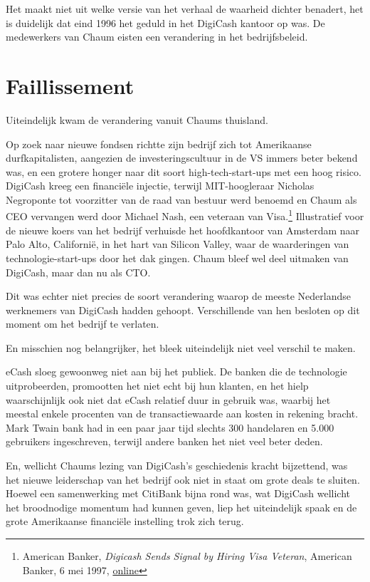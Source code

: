 \documentclass[
  a5paper,
  smalldemyvopaper,11pt,twoside,onecolumn,openright,extrafontsizes,
hidelinks]{memoir}
\begin{document}
Het maakt niet uit welke versie van het verhaal de waarheid dichter
benadert, het is duidelijk dat eind 1996 het geduld in het DigiCash
kantoor op was. De medewerkers van Chaum eisten een verandering in het
bedrijfsbeleid.

\section{Faillissement}\label{faillissement}

Uiteindelijk kwam de verandering vanuit Chaums thuisland.

Op zoek naar nieuwe fondsen richtte zijn bedrijf zich tot Amerikaanse
durfkapitalisten, aangezien de investeringscultuur in de VS immers beter
bekend was, en een grotere honger naar dit soort high-tech-start-ups met
een hoog risico. DigiCash kreeg een financiële injectie, terwijl
MIT-hoogleraar Nicholas Negroponte tot voorzitter van de raad van
bestuur werd benoemd en Chaum als CEO vervangen werd door Michael Nash,
een veteraan van Visa.\footnote{American Banker, \emph{Digicash Sends
  Signal by Hiring Visa Veteran}, American Banker, 6 mei 1997,
  \href{https://www.americanbanker.com/news/digicash-sends-signal-by-hiring-visa-veteran}{online}}
Illustratief voor de nieuwe koers van het bedrijf verhuisde het
hoofdkantoor van Amsterdam naar Palo Alto, Californië, in het hart van
Silicon Valley, waar de waarderingen van technologie-start-ups door het
dak gingen. Chaum bleef wel deel uitmaken van DigiCash, maar dan nu als
CTO.

Dit was echter niet precies de soort verandering waarop de meeste
Nederlandse werknemers van DigiCash hadden gehoopt. Verschillende van
hen besloten op dit moment om het bedrijf te verlaten.

En misschien nog belangrijker, het bleek uiteindelijk niet veel verschil
te maken.

eCash sloeg gewoonweg niet aan bij het publiek. De banken die de
technologie uitprobeerden, promootten het niet echt bij hun klanten, en
het hielp waarschijnlijk ook niet dat eCash relatief duur in gebruik
was, waarbij het meestal enkele procenten van de transactiewaarde aan
kosten in rekening bracht. Mark Twain bank had in een paar jaar tijd
slechts 300 handelaren en 5.000 gebruikers ingeschreven, terwijl andere
banken het niet veel beter deden.

En, wellicht Chaums lezing van DigiCash's geschiedenis kracht
bijzettend, was het nieuwe leiderschap van het bedrijf ook niet in staat
om grote deals te sluiten. Hoewel een samenwerking met CitiBank bijna
rond was, wat DigiCash wellicht het broodnodige momentum had kunnen
geven, liep het uiteindelijk spaak en de grote Amerikaanse financiële
instelling trok zich terug.
\end{document}
